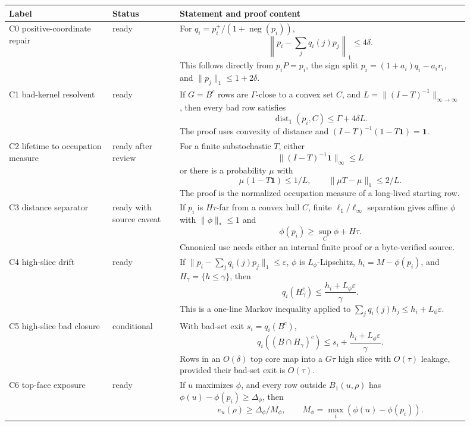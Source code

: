 \documentclass[11pt]{article}
\newcommand{\one}{\mathbf{1}}
\newcommand{\dist}{\operatorname{dist}}
\newcommand{\negm}{\operatorname{neg}}
\newcommand{\status}[1]{\textsf{#1}}
\newcommand{\ready}{\status{ready}}
\newcommand{\conditional}{\status{conditional}}
\theoremstyle{definition}
\begin{document}
\begin{longtable}{p{0.20\linewidth}p{0.13\linewidth}p{0.57\linewidth}}
\toprule
Label & Status & Statement and proof content\\
\midrule
\endhead
C0 positive-coordinate repair &
\ready{} &
For \(q_i=p_i^+/(1+\negm(p_i))\),
\[
  \left\|p_i-\sum_jq_i(j)p_j\right\|_1\leq 4\delta.
\]
This follows directly from \(p_iP=p_i\), the sign split
\(p_i=(1+a_i)q_i-a_ir_i\), and \(\|p_j\|_1\leq1+2\delta\).\\
\addlinespace
C1 bad-kernel resolvent &
\ready{} &
If \(G=B^c\) rows are \(\Gamma\)-close to a convex set \(C\), and
\(L=\|(I-T)^{-1}\|_{\infty\to\infty}\), then every bad row satisfies
\[
  \dist_1(p_i,C)\leq\Gamma+4\delta L.
\]
The proof uses convexity of distance and
\((I-T)^{-1}(1-T\one)=\one\).\\
\addlinespace
C2 lifetime to occupation measure &
\ready{} after review &
For a finite substochastic \(T\), either
\[
  \|(I-T)^{-1}\one\|_\infty\leq L
\]
or there is a probability \(\mu\) with
\[
  \mu(1-T\one)\leq 1/L,\qquad \|\mu T-\mu\|_1\leq 2/L.
\]
The proof is the normalized occupation measure of a long-lived starting row.\\
\addlinespace
C3 distance separator &
\ready{} with source caveat &
If \(p_i\) is \(H\tau\)-far from a convex hull \(C\), finite
\(\ell_1/\ell_\infty\) separation gives affine \(\phi\) with
\(\|\phi\|_*\leq1\) and
\[
  \phi(p_i)\geq \sup_C\phi+H\tau.
\]
Canonical use needs either an internal finite proof or a byte-verified source.\\
\addlinespace
C4 high-slice drift &
\ready{} &
If \(\|p_i-\sum_jq_i(j)p_j\|_1\leq\varepsilon\), \(\phi\) is
\(L_\phi\)-Lipschitz, \(h_i=M-\phi(p_i)\), and
\(H_\gamma=\{h\leq\gamma\}\), then
\[
  q_i(H_\gamma^c)\leq \frac{h_i+L_\phi\varepsilon}{\gamma}.
\]
This is a one-line Markov inequality applied to
\(\sum_jq_i(j)h_j\leq h_i+L_\phi\varepsilon\).\\
\addlinespace
C5 high-slice bad closure &
\conditional{} &
With bad-set exit \(s_i=q_i(B^c)\),
\[
  q_i((B\cap H_\gamma)^c)
  \leq s_i+\frac{h_i+L_\phi\varepsilon}{\gamma}.
\]
Rows in an \(O(\delta)\) top core map into a \(G\tau\) high slice with
\(O(\tau)\) leakage, provided their bad-set exit is \(O(\tau)\).\\
\addlinespace
C6 top-face exposure &
\ready{} &
If \(u\) maximizes \(\phi\), and every row outside \(B_1(u,\rho)\) has
\(\phi(u)-\phi(p_i)\geq\Delta_\phi\), then
\[
  e_u(\rho)\geq \Delta_\phi/M_\phi,\qquad
  M_\phi=\max_i(\phi(u)-\phi(p_i)).
\]

\end{longtable}
\end{document}
